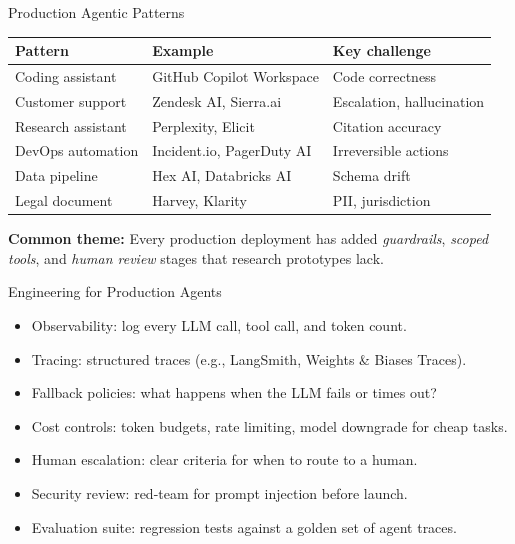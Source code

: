 \documentclass[aspectratio=169,10pt]{beamer}
\begin{document}
\begin{frame}{Production Agentic Patterns}
  \begin{center}
  \begin{tabular}{lll}
    \toprule
    \textbf{Pattern} & \textbf{Example} & \textbf{Key challenge} \\
    \midrule
    Coding assistant & GitHub Copilot Workspace & Code correctness \\
    Customer support & Zendesk AI, Sierra.ai & Escalation, hallucination \\
    Research assistant & Perplexity, Elicit & Citation accuracy \\
    DevOps automation & Incident.io, PagerDuty AI & Irreversible actions \\
    Data pipeline & Hex AI, Databricks AI & Schema drift \\
    Legal document & Harvey, Klarity & PII, jurisdiction \\
    \bottomrule
  \end{tabular}
  \end{center}
  \vspace{0.3em}
  \textbf{Common theme:} Every production deployment has added \emph{guardrails}, \emph{scoped tools},
  and \emph{human review} stages that research prototypes lack.
\end{frame}

\begin{frame}{Engineering for Production Agents}
  \begin{tcolorbox}[hitbox, title=Production Checklist]
    \begin{itemize}
      \item[$\square$] Observability: log every LLM call, tool call, and token count.
      \item[$\square$] Tracing: structured traces (e.g., LangSmith, Weights \& Biases Traces).
      \item[$\square$] Fallback policies: what happens when the LLM fails or times out?
      \item[$\square$] Cost controls: token budgets, rate limiting, model downgrade for cheap tasks.
      \item[$\square$] Human escalation: clear criteria for when to route to a human.
      \item[$\square$] Security review: red-team for prompt injection before launch.
      \item[$\square$] Evaluation suite: regression tests against a golden set of agent traces.
    \end{itemize}
  \end{tcolorbox}
\end{frame}
\end{document}
